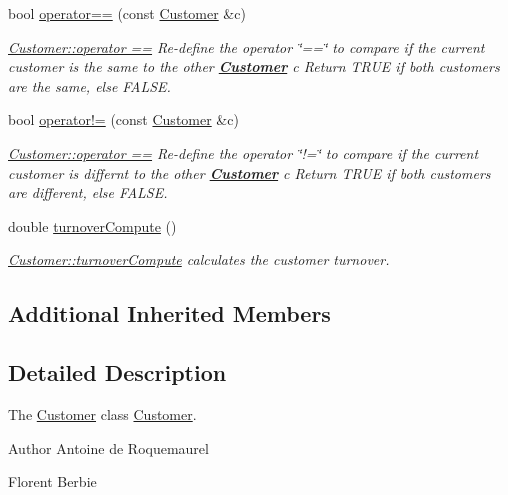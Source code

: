 \begin{DoxyCompactItemize}
bool \hyperlink{classModels_1_1Customer_ab379700fa93f5b9eb0f8546b03aff70f}{operator==} (const \hyperlink{classModels_1_1Customer}{Customer} \&c)
\begin{DoxyCompactList}\small\item\em \hyperlink{classModels_1_1Customer_ab379700fa93f5b9eb0f8546b03aff70f}{Customer\-::operator ==} Re-\/define the operator \char`\"{}==\char`\"{} to compare if the current customer is the same to the other {\bfseries \hyperlink{classModels_1_1Customer}{Customer}} {\itshape c} Return T\-R\-U\-E if both customers are the same, else F\-A\-L\-S\-E. \end{DoxyCompactList}\item 
bool \hyperlink{classModels_1_1Customer_a07e61dd9ad79b6be765ea1dabccf1e18}{operator!=} (const \hyperlink{classModels_1_1Customer}{Customer} \&c)
\begin{DoxyCompactList}\small\item\em \hyperlink{classModels_1_1Customer_ab379700fa93f5b9eb0f8546b03aff70f}{Customer\-::operator ==} Re-\/define the operator \char`\"{}!=\char`\"{} to compare if the current customer is differnt to the other {\bfseries \hyperlink{classModels_1_1Customer}{Customer}} {\itshape c} Return T\-R\-U\-E if both customers are different, else F\-A\-L\-S\-E. \end{DoxyCompactList}\item 
double \hyperlink{classModels_1_1Customer_abfc72b1cc4b2f1cdb106e0d50cfcb82f}{turnover\-Compute} ()
\begin{DoxyCompactList}\small\item\em \hyperlink{classModels_1_1Customer_abfc72b1cc4b2f1cdb106e0d50cfcb82f}{Customer\-::turnover\-Compute} calculates the customer turnover. \end{DoxyCompactList}\end{DoxyCompactItemize}
\subsection*{Additional Inherited Members}


\subsection{Detailed Description}
The \hyperlink{classModels_1_1Customer}{Customer} class \hyperlink{classModels_1_1Customer}{Customer}. 

\begin{DoxyAuthor}{Author}
Antoine de Roquemaurel 

Florent Berbie 
\end{DoxyAuthor}



